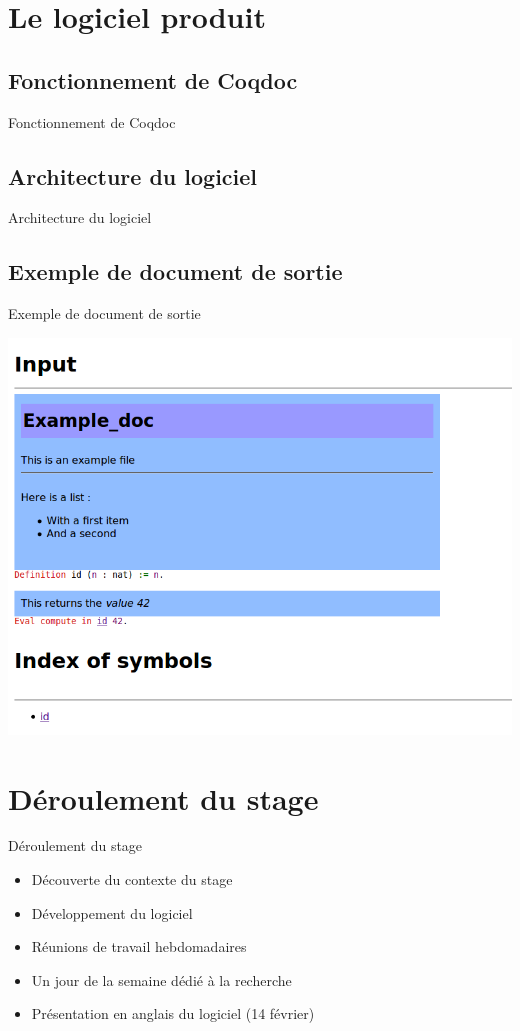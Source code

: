 \documentclass[compress]{beamer}
\newenvironment{tframe}[1]{
  \subsection{#1}
  \begin{frame}{#1}
  }{
  \end{frame}
  }
\begin{document}
\section{Le logiciel produit}

\begin{tframe}{Fonctionnement de Coqdoc}
  \begin{figure}
    
  \end{figure}
\end{tframe}

\begin{tframe}{Architecture du logiciel}
  \begin{figure}
    
  \end{figure}
\end{tframe}

\begin{tframe}{Exemple de document de sortie}
\begin{center}
\includegraphics[scale=0.4]{input.png}
\end{center}
\end{tframe}

\section{Déroulement du stage}
\begin{frame}{Déroulement du stage}
  \begin{itemize}
    \item Découverte du contexte du stage
    \item Développement du logiciel
    \item Réunions de travail hebdomadaires
    \item Un jour de la semaine dédié à la recherche
    \item Présentation en anglais du logiciel (14 février)
  \end{itemize}
\end{frame}
\end{document}
